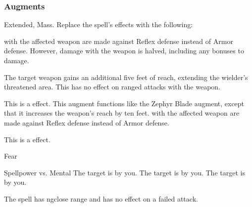\subsubsection{Augments}
 Extended, Mass.
Replace
the spell's effects with the following:
\begin{augmenteffects}
\spelleffect
{} with the affected weapon are made against Reflex defense instead of Armor defense.
However, damage with the weapon is halved, including any bonuses to damage.
\spelldur \durshort
\end{augmenteffects}
The target weapon gains an additional five feet of reach, extending the wielder's threatened area.
This has no effect on ranged attacks with the weapon.
\par
This is a  effect.
This augment functions like the Zephyr Blade augment, except that it increases the weapon's reach by ten feet.
 with the affected weapon are made against Reflex defense instead of Armor defense.
\par
This is a  effect.
\begin{spellsection}{Fear}
\begin{spellheader}
\end{spellheader}
\begin{spellcontent}
\begin{spelltargetinginfo}
\end{spelltargetinginfo}
\begin{spelleffects}
\begin{spellattack}{Spellpower vs. Mental}
\spellsuccess The target is \frightened by you.
\spellcritical The target is \panicked by you.
\spellfailure The target is \shaken by you.
\end{spellattack}
\end{spelleffects}
\end{spellcontent}
\begin{spellfooter}
\miscastexplode
\end{spellfooter}
\begin{spellcantrip}
The spell has
ngclose range and has no effect on a failed attack.
\end{spellcantrip}
\end{spellsection}
